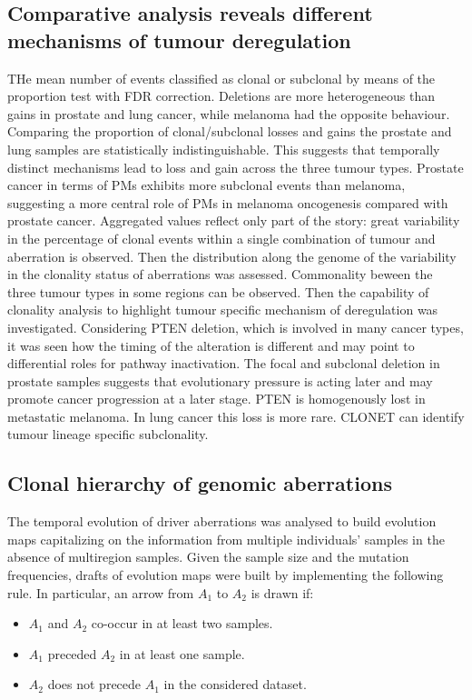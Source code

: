 	\subsection{Comparative analysis reveals different mechanisms of tumour deregulation}
	THe mean number of events classified as clonal or subclonal by means of the proportion test with FDR correction.
	Deletions are more heterogeneous than gains in prostate and lung cancer, while melanoma had the opposite behaviour.
	Comparing the proportion of clonal/subclonal losses and gains the prostate and lung samples are statistically indistinguishable.
	This suggests that temporally distinct mechanisms lead to loss and gain across the three tumour types.
	Prostate cancer in terms of PMs exhibits more subclonal events than melanoma, suggesting a more central role of PMs in melanoma oncogenesis compared with prostate cancer.
	Aggregated values reflect only part of the story: great variability in the percentage of clonal events within a single combination of tumour and aberration is observed.
	Then the distribution along the genome of the variability in the clonality status of aberrations was assessed.
	Commonality beween the three tumour types in some regions can be observed.
	Then the capability of clonality analysis to highlight tumour specific mechanism of deregulation was investigated.
	Considering PTEN deletion, which is involved in many cancer types, it was seen how the timing of the alteration is different and may point to differential roles for pathway inactivation.
	The focal and subclonal deletion in prostate samples suggests that evolutionary pressure is acting later and may promote cancer progression at a later stage.
	PTEN is homogenously lost in metastatic melanoma.
	In lung cancer this loss is more rare.
	CLONET can identify tumour lineage specific subclonality.

	\subsection{Clonal hierarchy of genomic aberrations}
	The temporal evolution of driver aberrations was analysed to build evolution maps capitalizing on the information from multiple individuals' samples in the absence of multiregion samples.
	Given the sample size and the mutation frequencies, drafts of evolution maps were built by implementing the following rule.
	In particular, an arrow from $A_1$ to $A_2$ is drawn if:

	\begin{multicols}{2}
		\begin{itemize}
			\item $A_1$ and $A_2$ co-occur in at least two samples.
			\item $A_1$ preceded $A_2$ in at least one sample.
			\item $A_2$ does not precede $A_1$ in the considered dataset.
		\end{itemize}
	\end{multicols}

